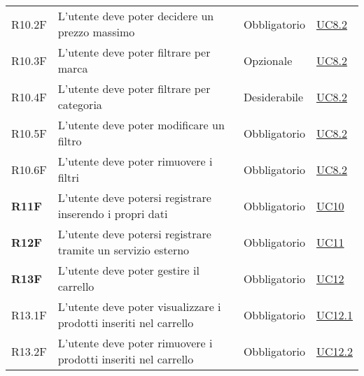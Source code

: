 \begin{center}
\begin{longtable}[!h]{p{50px} p{245px} p{75px} p{50px}}
        R10.2F                                & L'utente deve poter decidere un prezzo massimo                                                             & Obbligatorio             & \hyperref[sec:UC8.2]{UC8.2}                  \\
        R10.3F                                & L'utente deve poter filtrare per marca                                                                     & Opzionale                & \hyperref[sec:UC8.2]{UC8.2}                  \\
        R10.4F                                & L'utente deve poter filtrare per categoria                                                                 & Desiderabile             & \hyperref[sec:UC8.2]{UC8.2}                  \\
        R10.5F                                & L'utente deve poter modificare un filtro                                                                   & Obbligatorio             & \hyperref[sec:UC8.2]{UC8.2}                  \\
        R10.6F                                & L'utente deve poter rimuovere i filtri                                                                     & Obbligatorio             & \hyperref[sec:UC8.2]{UC8.2}                  \\
        \textbf{R11F}                         & L'utente deve potersi registrare inserendo i propri dati                                                   & Obbligatorio             & \hyperref[sec:UC10]{UC10}                    \\
        \textbf{R12F}                         & L'utente deve potersi registrare tramite un servizio esterno                                               & Obbligatorio             & \hyperref[sec:UC11]{UC11}                    \\
        \textbf{R13F}                         & L'utente deve poter gestire il carrello                                                                    & Obbligatorio             & \hyperref[sec:UC12]{UC12}                    \\
        R13.1F                                & L'utente deve poter visualizzare i prodotti inseriti nel carrello                                          & Obbligatorio             & \hyperref[sec:UC12.1]{UC12.1}                \\
        R13.2F                                & L'utente deve poter rimuovere i prodotti inseriti nel carrello                                             & Obbligatorio             & \hyperref[sec:UC12.2]{UC12.2}                \\

\end{longtable}
\end{center}
